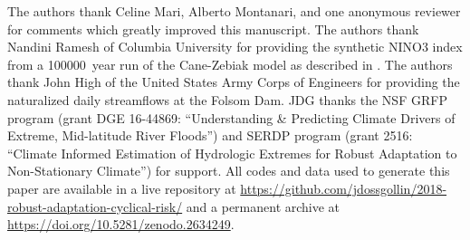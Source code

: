 \documentclass[
  draft,
  linenumbers
]{agujournal2019}
\begin{document}

\acknowledgments

The authors thank Celine Mari, Alberto Montanari, and one anonymous reviewer for comments which greatly improved this manuscript.
The authors thank Nandini Ramesh of Columbia University for providing the synthetic NINO3 index from a \SI{100000}{year} run of the Cane-Zebiak model as described in \citet{Ramesh:2016hf}.
The authors thank John High of the United States Army Corps of Engineers for providing the naturalized daily streamflows at the Folsom Dam.
JDG thanks the NSF GRFP program (grant DGE 16-44869: ``Understanding \& Predicting Climate Drivers of Extreme, Mid-latitude River Floods'') and SERDP program (grant 2516: ``Climate Informed Estimation of Hydrologic Extremes for Robust Adaptation to Non-Stationary Climate'') for support.
All codes and data used to generate this paper are available in a live repository at \url{https://github.com/jdossgollin/2018-robust-adaptation-cyclical-risk/} and a permanent archive at \url{https://doi.org/10.5281/zenodo.2634249}.

\end{document}
